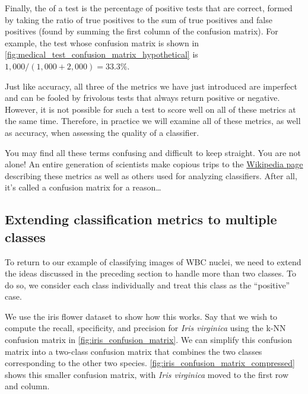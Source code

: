 Finally, the  of a test is the percentage of positive tests that are correct, formed by taking the ratio of true positives to the sum of true positives and false positives (found by summing the first column of the confusion matrix). For example, the  test whose confusion matrix is shown in \autoref{fig:medical_test_confusion_matrix_hypothetical} is $1,000/(1,000 + 2,000) = 33.3\%$.\\

\begin{qbox}\end{qbox}

Just like accuracy, all three of the metrics we have just introduced are imperfect and can be fooled by frivolous tests that always return positive or negative. However, it is not possible for such a test to score well on all of these metrics at the same time. Therefore, in practice we will examine all of these metrics, as well as accuracy, when assessing the quality of a classifier.\\

\begin{qbox}\end{qbox}

You may find all these terms confusing and difficult to keep straight. You are not alone! An entire generation of scientists make copious trips to the \href{https://en.wikipedia.org/wiki/Precision_and_recall#Definition_(classification_context)}{Wikipedia page} describing these metrics as well as others used for analyzing classifiers. After all, it's called a confusion matrix for a reason\ldots

\FloatBarrier
{}
\subsection{Extending classification metrics to multiple classes}

To return to our example of classifying images of WBC nuclei, we need to extend the ideas discussed in the preceding section to handle more than two classes. To do so, we consider each class individually and treat this class as the ``positive'' case.

We use the iris flower dataset to show how this works. Say that we wish to compute the recall, specificity, and precision for \textit{Iris virginica} using the k-NN confusion matrix in \autoref{fig:iris_confusion_matrix}. We can simplify this confusion matrix into a two-class confusion matrix that combines the two classes corresponding to the other two species. \autoref{fig:iris_confusion_matrix_compressed}
 shows this smaller confusion matrix, with \textit{Iris virginica} moved to the first row and column.\\
 
